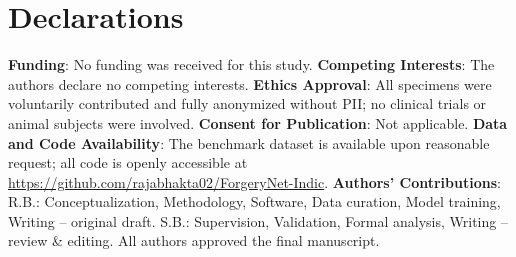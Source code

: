 \documentclass[pdflatex,sn-mathphys-num,iicol]{sn-jnl}
\begin{document}
\backmatter

\section*{Declarations}
\noindent\textbf{Funding}: No funding was received for this study. \textbf{Competing Interests}: The authors declare no competing interests. \textbf{Ethics Approval}: All specimens were voluntarily contributed and fully anonymized without PII; no clinical trials or animal subjects were involved. \textbf{Consent for Publication}: Not applicable. \textbf{Data and Code Availability}: The benchmark dataset is available upon reasonable request; all code is openly accessible at \url{https://github.com/rajabhakta02/ForgeryNet-Indic}. \textbf{Authors' Contributions}: R.B.: Conceptualization, Methodology, Software, Data curation, Model training, Writing -- original draft. S.B.: Supervision, Validation, Formal analysis, Writing -- review \& editing. All authors approved the final manuscript.


\end{document}
